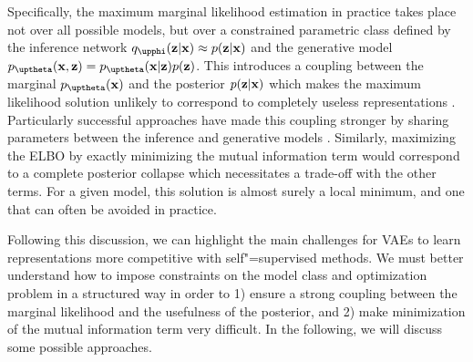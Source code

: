 Specifically, the maximum marginal likelihood estimation in practice takes place not over all possible models, but over a constrained parametric class defined by the inference network $q_\phib(\zb|\xb) \approx p(\zb|\xb)$ and the generative model $p_\thetab(\xb,\zb) = p_\thetab(\xb|\zb)p(\zb)$. 
This introduces a coupling between the marginal $p_{\thetab}(\xb)$ and the posterior $p({\mathbf{z}}|{\mathbf{x}})$ which makes the maximum likelihood solution unlikely to correspond to completely useless representations \parencite{huszar_is_2017}. Particularly successful approaches have made this coupling stronger by sharing parameters between the inference and generative models \parencite{sonderby_ladder_2016,maaloe_biva_2019,vahdat_nvae_2020,child_very_2021}.
Similarly, maximizing the ELBO %
by exactly minimizing the mutual information term would correspond to a complete posterior collapse which necessitates a trade-off with the other terms. For a given model, this solution is almost surely a local minimum, and one that can often be avoided in practice. 

Following this discussion, we can highlight the main challenges for VAEs to learn representations more competitive with self"=supervised methods. We must better understand how to impose constraints on the model class and optimization problem in a structured way in order to 1) ensure a strong coupling between the marginal likelihood and the usefulness of the posterior, and 2) make minimization of the mutual information term very difficult. In the following, we will discuss some possible approaches.


